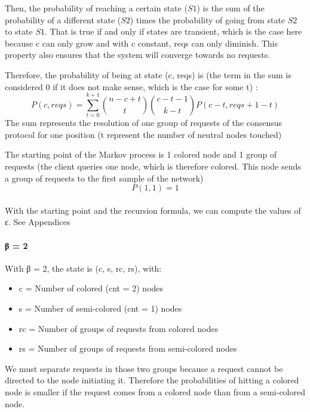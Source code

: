 \documentclass[11pt, twocolumn]{article}
\begin{document}
Then, the probability of reaching a certain state ($S1$) is the sum of the probability of a different state ($S2$) times the probability of going from state $S2$ to state $S1$.
That is true if and only if states are transient, which is the case here because c can only grow and with c constant, reqs can only diminish. This property also ensures that the system will converge towards no requests.

Therefore, the probability of being at state (c, reqs) is (the term in the sum is considered 0 if it does not make sense, which is the case for some t) :
\begin{equation*}
    P(c, reqs) = \sum_{t=0}^{k+1} {n-c+t \choose t}{c-t-1 \choose k-t}P(c-t, reqs+1-t)
\end{equation*}
The sum represents the resolution of one group of requests of the consensus protocol for one position (t represent the number of neutral nodes touched)

The starting point of the Markov process is 1 colored node and 1 group of requests (the client queries one node, which is therefore colored. This node sends a group of requests to the first sample of the network)
\begin{equation*}
    P(1, 1) = 1
\end{equation*}
\\
With the starting point and the recursion formula, we can compute the values of ε. See Appendices 

\paragraph{β = 2}
With β = 2, the state is (c, s, rc, rs), with:
\begin{itemize}
    \item c = Number of colored (cnt = 2) nodes
    \item s = Number of semi-colored (cnt = 1) nodes
    \item rc = Number of groups of requests from colored nodes
    \item rs = Number of groups of requests from semi-colored nodes
\end{itemize}

We must separate requests in those two groups because a request cannot be directed to the node initiating it.
Therefore the probabilities of hitting a colored node is smaller if the request comes from a colored node than from a semi-colored node.
\end{document}

